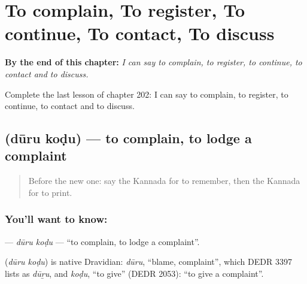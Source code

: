 
\chapter{To complain, To register, To continue, To contact, To discuss}
\label{ch:ka-to-complain-to-register-to-continue-to-contact-to-discuss}

\begin{chapteropening}
\textbf{By the end of this chapter:} \emph{I can say to complain, to register, to continue, to contact and to discuss.}

Complete the last lesson of chapter 202: I can say to complain, to register, to continue, to contact and to discuss.
\end{chapteropening}

\section[\texorpdfstring{\kn{ದೂರು} \kn{ಕೊಡು} (dūru koḍu)}{ದೂರು ಕೊಡು (dūru koḍu)}]{  (dūru koḍu) — to complain, to lodge a complaint}

\label{lesson:KA-C202-duru-kodu}



\begin{quote}
Before the new one: say the Kannada for to remember, then the Kannada for to print.
\end{quote}

\subsection*{You'll want to know:  }
\textbf{ } — \emph{dūru koḍu} — \textquotedblleft{}to complain, to lodge a complaint\textquotedblright{}.

\begin{cousinweb}
\textbf{ } (\emph{dūru koḍu}) is native Dravidian: \emph{dūru}, \textquotedblleft{}blame, complaint\textquotedblright{}, which DEDR 3397 lists as \emph{dūṟu}, and \emph{koḍu}, \textquotedblleft{}to give\textquotedblright{} (DEDR 2053): \textquotedblleft{}to give a complaint\textquotedblright{}.
\end{cousinweb}

